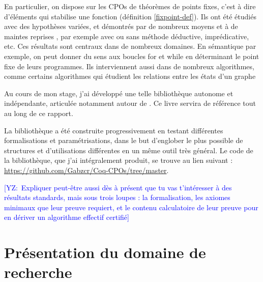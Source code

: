 \documentclass{article}
\newcommand{\yz}[1]{\textcolor{blue}{{[YZ:~#1]}}}
\theoremstyle{definition}
\begin{document}
En particulier, on dispose sur les CPOs de théorèmes de points fixes, c'est à dire d'éléments qui stabilise une fonction (définition \ref{fixpoint-def}). Ils ont été étudiés avec des hypothèses variées, et démontrés par de nombreux moyens et à de maintes reprises \cite{main} \cite{proofs} \cite{ktnote}, par exemple avec ou sans méthode déductive, imprédicative, etc. Ces résultats sont centraux dans de nombreux domaines. En sémantique par exemple, on peut donner du sens aux boucles for et while en déterminant le point fixe de leurs programmes. Ils interviennent aussi dans de nombreux algorithmes, comme certains algorithmes qui étudient les relations entre les états d'un graphe



Au cours de mon stage, j'ai développé une telle bibliothèque autonome et indépendante, articulée notamment autour de \cite[chapitre 8]{main}. Ce livre servira de référence tout au long de ce rapport.

La bibliothèque a été construite progressivement en testant différentes formalisations et paramétrisations, dans le but d'englober le plus possible de structures et d'utilisations différentes en un même outil très général. Le code de la bibliothèque, que j'ai intégralement produit, se trouve au lien suivant \cite{code}: \href{https://github.com/Gabzcr/Coq-CPOs/tree/master}{https://github.com/Gabzcr/Coq-CPOs/tree/master}.


\yz{Expliquer peut-être aussi dès à présent que tu vas t'intéresser à des résultats standards,
mais sous trois loupes : la formalisation, les axiomes minimaux que leur preuve
requiert, et le contenu calculatoire de leur preuve pour en dériver un
algorithme effectif certifié}

{
  \hypersetup{linkcolor=black}
  \tableofcontents
}

\section{Présentation du domaine de recherche}
\end{document}
